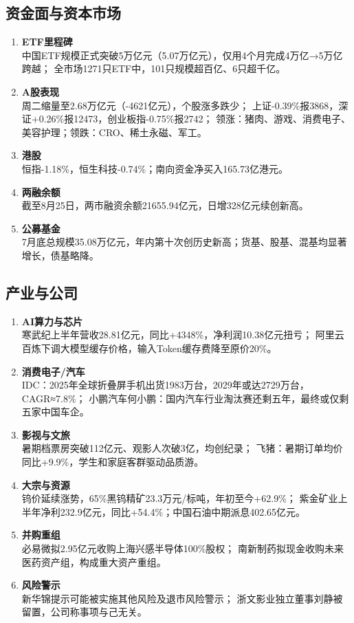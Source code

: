 \subsection{资金面与资本市场}
\begin{enumerate}[leftmargin=*, nosep]
    \item \textbf{ETF里程碑}  \\
    中国ETF规模正式突破5万亿元（5.07万亿元），仅用4个月完成4万亿→5万亿跨越；  
    全市场1271只ETF中，101只规模超百亿、6只超千亿。
    \item \textbf{A股表现}  \\
    周二缩量至2.68万亿元（-4621亿元），个股涨多跌少；  
    上证-0.39\%报3868，深证+0.26\%报12473，创业板指-0.75\%报2742；  
    领涨：猪肉、游戏、消费电子、美容护理；领跌：CRO、稀土永磁、军工。
    \item \textbf{港股}  \\
    恒指-1.18\%，恒生科技-0.74\%；南向资金净买入165.73亿港元。
    \item \textbf{两融余额}  \\
    截至8月25日，两市融资余额21655.94亿元，日增328亿元续创新高。
    \item \textbf{公募基金}  \\
    7月底总规模35.08万亿元，年内第十次创历史新高；货基、股基、混基均显著增长，债基略降。
\end{enumerate}

\subsection{产业与公司}
\begin{enumerate}[leftmargin=*, nosep]
    \item \textbf{AI算力与芯片}  \\
    寒武纪上半年营收28.81亿元，同比+4348\%，净利润10.38亿元扭亏；  
    阿里云百炼下调大模型缓存价格，输入Token缓存费降至原价20\%。
    \item \textbf{消费电子/汽车}  \\
    IDC：2025年全球折叠屏手机出货1983万台，2029年或达2729万台，CAGR≈7.8\%；  
    小鹏汽车何小鹏：国内汽车行业淘汰赛还剩五年，最终或仅剩五家中国车企。
    \item \textbf{影视与文旅}  \\
    暑期档票房突破112亿元、观影人次破3亿，均创纪录；  
    飞猪：暑期订单均价同比+9.9\%，学生和家庭客群驱动品质游。
    \item \textbf{大宗与资源}  \\
    钨价延续涨势，65\%黑钨精矿23.3万元/标吨，年初至今+62.9\%；  
    紫金矿业上半年净利232.9亿元，同比+54.4\%；中国石油中期派息402.65亿元。
    \item \textbf{并购重组}  \\
    必易微拟2.95亿元收购上海兴感半导体100\%股权；  
    南新制药拟现金收购未来医药资产组，构成重大资产重组。
    \item \textbf{风险警示}  \\
    新华锦提示可能被实施其他风险及退市风险警示；  
    浙文影业独立董事刘静被留置，公司称事项与己无关。
\end{enumerate}

